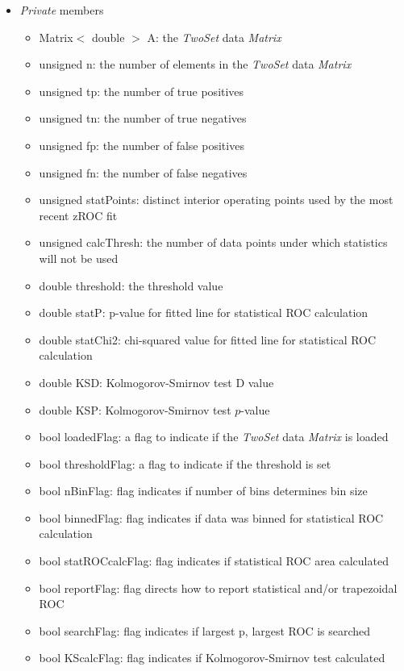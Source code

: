 \documentclass{report}
\begin{document}
\begin{itemize}
\begin{itemize}
\end{itemize}

\item {\em Private} members

\begin{itemize}
\item Matrix$<$ double $>$ A: the {\em TwoSet} data {\em Matrix}
\item unsigned n: the number of elements in the {\em TwoSet} data {\em
      Matrix}
\item unsigned tp: the number of true positives
\item unsigned tn: the number of true negatives
\item unsigned fp: the number of false positives
\item unsigned fn: the number of false negatives
\item unsigned statPoints: distinct interior operating points used by
      the most recent zROC fit
\item unsigned calcThresh: the number of data points under which
      statistics will not be used
\item double threshold: the threshold value
\item double statP: p-value for fitted line for statistical ROC
      calculation
\item double statChi2: chi-squared value for fitted line for
      statistical ROC calculation
\item double KSD: Kolmogorov-Smirnov test D value
\item double KSP: Kolmogorov-Smirnov test $p$-value
\item bool loadedFlag: a flag to indicate if the {\em TwoSet} data
      {\em Matrix} is loaded
\item bool thresholdFlag: a flag to indicate if the threshold is set
\item bool nBinFlag: flag indicates if number of bins determines bin
      size
\item bool binnedFlag: flag indicates if data was binned for
      statistical ROC calculation
\item bool statROCcalcFlag: flag indicates if statistical ROC area
      calculated
\item bool reportFlag: flag directs how to report statistical and/or
      trapezoidal ROC
\item bool searchFlag: flag indicates if largest p, largest ROC is
searched
\item bool KScalcFlag: flag indicates if Kolmogorov-Smirnov test
calculated
\end{itemize}


\end{itemize}
\end{document}
